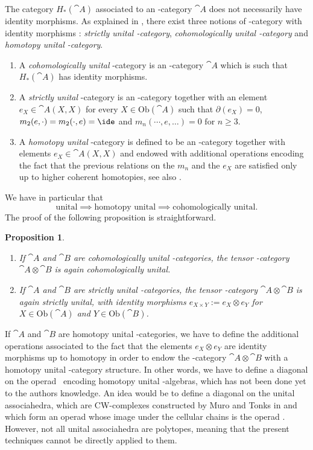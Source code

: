 \documentclass[JEP,XML,SOM,NoFloatCountersInSection,Unicode,published]{cedram}
\theoremstyle{definition}
\theoremstyle{plain}
\newtheorem{proposition}[definition]{Proposition}
\begin{document}
The category $H_*(\cat{A})$ associated to an \Ainf -category $\cat{A}$ does not necessarily have identity morphisms. As explained in \cite[\S 1.2]{Seidel08}, there exist three notions of \Ainf -category with identity morphisms : \textit{strictly unital \Ainf -category}, \textit{cohomologically unital \Ainf -category} and \textit{homotopy unital \Ainf -category}.
\begin{enumerate}
\item A \textit{cohomologically unital} \Ainf -category is an \Ainf -category $\cat{A}$ which is such that $H_*(\cat{A})$ has identity morphisms.
\item A \textit{strictly unital} \Ainf -category is an \Ainf -category together with an element $e_X \in \cat{A} (X,X)$ for every $X \in \mathrm{Ob}(\cat{A})$ such that $\partial (e_X) = 0$, $m_2 (e, \cdot) = m_2 (\cdot, e) = \ide$ and $m_n (\cdots, e,\dots) = 0 \text { for } n \geq 3$.
\item A \textit{homotopy unital} \Ainf -category is defined to be an \Ainf -category together with elements $e_X \in \cat{A} (X,X)$ and endowed with additional operations encoding the fact that the previous relations on the $m_n$ and the $e_X$ are satisfied only up to higher coherent homotopies, see also \cite[\S 6.1]{HirshMilles12}.
\end{enumerate}
We have in particular that
\[
\text{unital} \implies \text{homotopy unital} \implies \text{cohomologically unital}.
\]
The proof of the following proposition is straightforward.

\skpt
\begin{proposition}
\begin{enumerate}
\item If $\cat{A}$ and $\cat{B}$ are cohomologically unital \Ainf -categories, the tensor \Ainf -category $\cat{A} \otimes \cat{B}$ is again cohomologically unital.
\item If $\cat{A}$ and $\cat{B}$ are strictly unital \Ainf -categories, the tensor \Ainf -category $\cat{A} \otimes \cat{B}$ is again strictly unital, with identity morphisms $e_{X \times Y} := e_X \otimes e_Y$ for $X \in \mathrm{Ob}(\cat{A})$ and $Y \in \mathrm{Ob}(\cat{B})$.
\end{enumerate}
\end{proposition}

If $\cat{A}$ and $\cat{B}$ are homotopy unital \Ainf -categories, we have to define the additional operations associated to the fact that the elements $e_X \otimes e_Y$ are identity morphisms up to homotopy in order to endow the \Ainf -category $\cat{A} \otimes \cat{B}$ with a homotopy unital \Ainf -category structure. In other words, we have to define a diagonal on the operad \uAinf\ encoding homotopy unital \Ainf -algebras, which has not been done yet to the authors knowledge. An idea would be to define a diagonal on the unital associahedra, which are CW-complexes constructed by Muro and Tonks in \cite{MuroTonks} and which form an operad whose image under the cellular chains is the operad \uAinf. However, not all unital associahedra are polytopes, meaning that the present techniques cannot be directly applied to them.
\end{document}
